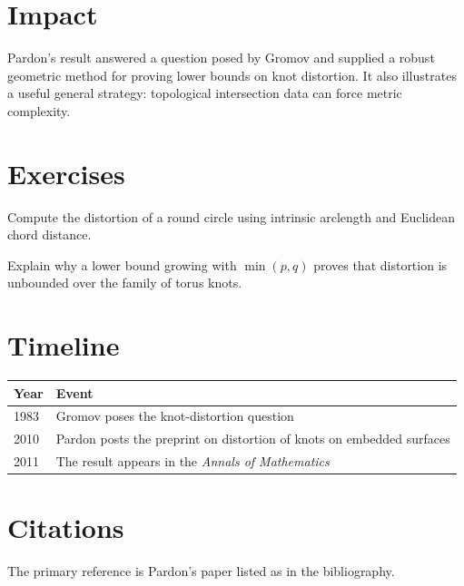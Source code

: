\section{Impact}

Pardon's result answered a question posed by Gromov and supplied a robust geometric method for proving lower bounds on knot distortion. It also illustrates a useful general strategy: topological intersection data can force metric complexity.

\section{Exercises}

\begin{exercise}[Basic]
Compute the distortion of a round circle using intrinsic arclength and Euclidean chord distance.
\end{exercise}

\begin{exercise}[Intermediate]
Explain why a lower bound growing with $\min(p,q)$ proves that distortion is unbounded over the family of torus knots.
\end{exercise}

\section{Timeline}

\begin{tabularx}{\linewidth}{lX}
\toprule
\textbf{Year} & \textbf{Event} \\ \midrule
1983 & Gromov poses the knot-distortion question \\
2010 & Pardon posts the preprint on distortion of knots on embedded surfaces \\
2011 & The result appears in the \emph{Annals of Mathematics} \\
\bottomrule
\end{tabularx}

\section{Citations}

The primary reference is Pardon’s paper listed as \cite{pardon2011} in the bibliography.
